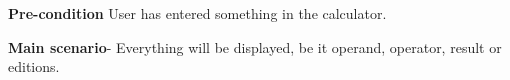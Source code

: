 \documentclass[12pt]{article}
\begin{document}
\textbf{Pre-condition} User has entered something in the calculator.\par

\textbf{Main scenario}- Everything will be displayed, be it operand, operator, result or editions.\par


\vspace{\baselineskip}

\vspace{\baselineskip}

\vspace{\baselineskip}

\vspace{\baselineskip}

\vspace{\baselineskip}

\vspace{\baselineskip}

\vspace{\baselineskip}

\vspace{\baselineskip}

\vspace{\baselineskip}

\vspace{\baselineskip}

\vspace{\baselineskip}

\vspace{\baselineskip}

\vspace{\baselineskip}

\vspace{\baselineskip}

\vspace{\baselineskip}

\vspace{\baselineskip}

\vspace{\baselineskip}

\vspace{\baselineskip}

\vspace{\baselineskip}

\vspace{\baselineskip}

\vspace{\baselineskip}

\vspace{\baselineskip}
\end{document}
